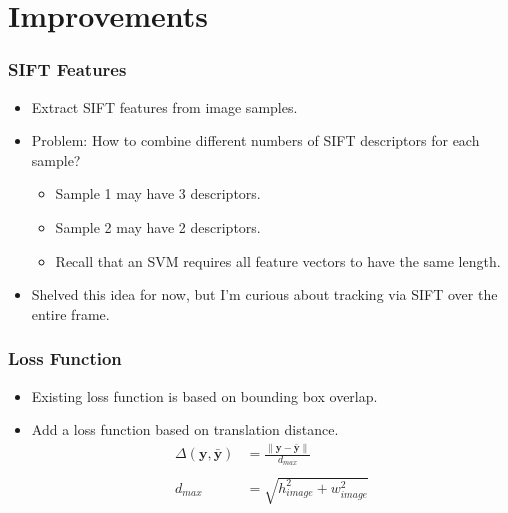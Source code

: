 \section{Improvements}

\begin{frame}
    \frametitle{SIFT Features}
    \begin{itemize}
        \item Extract SIFT features from image samples.
        \item Problem: How to combine different numbers of SIFT descriptors for each sample?
            \begin{itemize}
                \item Sample 1 may have 3 descriptors.
                \item Sample 2 may have 2 descriptors.
                \item Recall that an SVM requires all feature vectors to have the same length.
            \end{itemize}
        \item Shelved this idea for now, but I'm curious about tracking via SIFT over the entire
            frame.
    \end{itemize}
\end{frame}

\begin{frame}
    \frametitle{Loss Function}
    \begin{itemize}
        \item Existing loss function is based on bounding box overlap.
        \item Add a loss function based on translation distance.
            \begin{align}
                \Delta \left( \mathbf{y}, \mathbf{\bar{y}} \right) &= \frac{\|\mathbf{y} -
                \mathbf{\bar{y}}\|}{d_{max}} \\ \nonumber \\
                d_{max} &= \sqrt{h_{image}^2 + w_{image}^2}
            \end{align}
    \end{itemize}
\end{frame}

